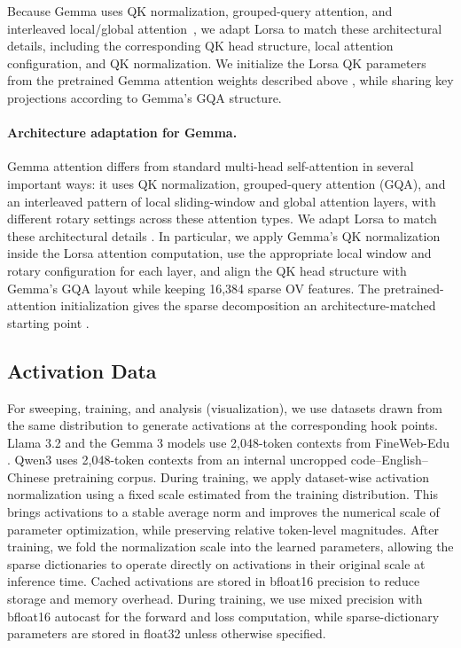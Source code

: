 \documentclass{article}
\begin{document}
Because Gemma uses QK normalization, grouped-query attention, and interleaved
local/global attention~\citep{team2025gemma, joshua2023gqa}, we adapt Lorsa to
match these architectural details, including the corresponding QK head
structure, local attention configuration, and QK normalization. We initialize the 
Lorsa QK parameters from the pretrained Gemma attention weights described above
\citep{wang2026dimensional}, while sharing key projections according to Gemma's GQA structure.

\paragraph{Architecture adaptation for Gemma.}
Gemma attention differs from standard multi-head self-attention in several
important ways: it uses QK normalization, grouped-query attention (GQA), and an
interleaved pattern of local sliding-window and global attention layers, with
different rotary settings across these attention types. We adapt Lorsa to match
these architectural details \citep{team2025gemma, joshua2023gqa}. In
particular, we apply Gemma's QK normalization inside the Lorsa attention
computation, use the appropriate local window and rotary configuration for each
layer, and align the QK head structure with Gemma's GQA layout while keeping
16,384 sparse OV features. The pretrained-attention initialization gives the
sparse decomposition an architecture-matched starting point
\citep{wang2026dimensional}.



\subsection{Activation Data}
For sweeping, training, and analysis (visualization), we use datasets drawn 
from the same distribution to generate activations at the corresponding hook points. 
Llama 3.2 and the Gemma 3 models use 2,048-token  contexts from FineWeb-Edu \citep{penedo2024fineweb}. 
Qwen3 uses 2,048-token contexts from an internal uncropped code--English--Chinese pretraining corpus. 
During training, we apply dataset-wise activation normalization using a fixed scale estimated from the 
training distribution. This brings activations to a stable average norm and improves the numerical scale 
of parameter optimization, while preserving relative token-level magnitudes. After training, we fold the
normalization scale into the learned parameters, allowing the sparse dictionaries to operate directly on 
activations in their original scale at inference time. Cached activations are stored in bfloat16 precision to 
reduce storage and memory overhead. During training, we use mixed precision with bfloat16 autocast
for the forward and loss computation, while sparse-dictionary parameters are stored in float32 unless otherwise 
specified.
\end{document}
